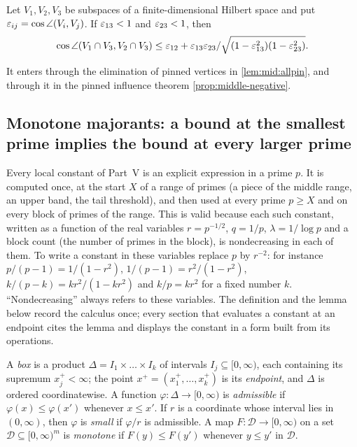 \begin{theorem}\label{thm:kassabov}
Let $V_1,V_2,V_3$ be subspaces of a finite-dimensional Hilbert space and put
$\varepsilon_{ij}=\cos\angle(V_i,V_j)$. If $\varepsilon_{13}<1$ and $\varepsilon_{23}<1$, then
\[
  \cos\angle(V_1\cap V_3,V_2\cap V_3)\le\varepsilon_{12}+\varepsilon_{13}\varepsilon_{23}/\sqrt{(1-\varepsilon_{13}^2)(1-\varepsilon_{23}^2)} .
\]
\end{theorem}

It enters through the elimination of pinned vertices in \cref{lem:mid:allpin},
and through it in the pinned influence theorem \cref{prop:middle-negative}.

\subsection{Monotone majorants: a bound at the smallest prime implies the bound at every larger prime}\label{subsec:notation:majorants}

Every local constant of Part~V is an explicit expression in a prime $p$. It is
computed once, at the start $X$ of a range of primes (a piece of the middle
range, an upper band, the tail threshold), and then used at every prime
$p\ge X$ and on every block of primes of the range. This is valid because each
such constant, written as a function of the real variables $r=p^{-1/2}$,
$q=1/p$, $\lambda=1/\log p$ and a block count (the number of primes in the block), is nondecreasing in each of
them. To write a constant in these variables replace $p$ by $r^{-2}$: for
instance $p/(p-1)=1/(1-r^2)$, $1/(p-1)=r^2/(1-r^2)$, $k/(p-k)=kr^2/(1-kr^2)$ and
$k/p=kr^2$ for a fixed number $k$. ``Nondecreasing'' always refers to these variables. The definition
and the lemma below record the calculus once; every section that evaluates a
constant at an endpoint cites the lemma and displays the constant in a form
built from its operations.

\begin{definition}\label{def:majorant}
A \emph{box} is a product $\Delta=I_1\times\dots\times I_k$ of intervals
$I_j\subseteq[0,\infty)$, each containing its supremum $x^+_j<\infty$; the
point $x^+=(x^+_1,\dots,x^+_k)$ is its \emph{endpoint}, and $\Delta$ is ordered
coordinatewise. A function $\varphi\colon\Delta\to[0,\infty)$ is
\emph{admissible} if $\varphi(x)\le\varphi(x')$ whenever $x\le x'$. If $r$ is a
coordinate whose interval lies in $(0,\infty)$, then $\varphi$ is \emph{small} if
$\varphi/r$ is admissible. A map $F\colon\mathcal D\to[0,\infty)$ on a set
$\mathcal D\subseteq[0,\infty)^m$ is \emph{monotone} if $F(y)\le F(y')$ whenever
$y\le y'$ in $\mathcal D$.
\end{definition}

